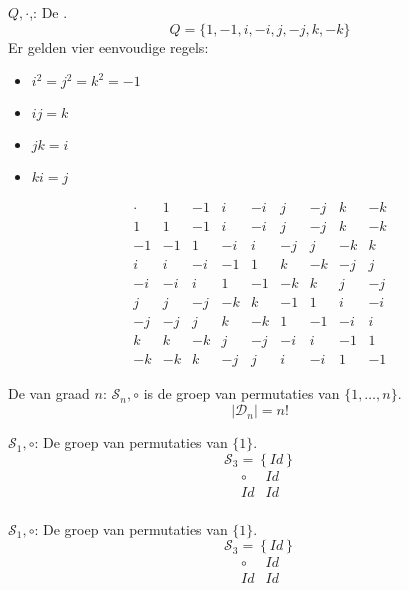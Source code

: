 \documentclass[main.tex]{subfiles}
\begin{document}
\begin{de}
  $Q,\cdot$,: De .\\
  \[ Q = \{ 1,-1,i,-i,j,-j,k,-k \} \]
  Er gelden vier eenvoudige regels:
  \begin{itemize}
  \item $i^{2}=j^{2}=k^{2}= -1$
  \item $ij=k$
  \item $jk=i$
  \item $ki=j$
  \end{itemize}
  \[
  \begin{array}{r|rrrrrrrr}
    \cdot & 1 & -1 & i & -i & j & -j & k & -k\\
    \hline
    1 & 1 & -1 & i & -i & j & -j & k & -k\\
    -1 & -1 & 1 & -i & i & -j & j & -k & k\\
    i & i & -i & -1 & 1 & k & -k & -j & j\\
    -i & -i & i & 1 & -1 & -k & k & j & -j\\
    j & j & -j & -k & k & -1 & 1 & i & -i\\
    -j & -j & j & k & -k & 1 & -1 & -i & i\\
    k & k & -k & j & -j & -i & i & -1 & 1\\
    -k & -k & k & -j & j & i & -i & 1 & -1
  \end{array}
  \]
\commn \cycln
\end{de}


\begin{de}
  De  van graad $n$: $\mathcal{S}_{n},\circ$ is de groep van permutaties van $\{ 1,\dotsc,n \}$.
  \[ |\mathcal{D}_{n}| = n! \]
  \commn \cycln
\end{de}

\begin{vb}
  $\mathcal{S}_{1},\circ$: De groep van permutaties van $\{ 1 \}$.
  \[ \mathcal{S}_{3} = \left\{ Id \right\} \]
  \[
  \begin{array}{c|c}
    \circ & Id \\
    \hline
    Id & Id\\
  \end{array}
  \]
\commj {}
\end{vb}

\begin{vb}
  $\mathcal{S}_{1},\circ$: De groep van permutaties van $\{ 1 \}$.
  \[ \mathcal{S}_{3} = \left\{ Id \right\} \]
  \[
  \begin{array}{c|c}
    \circ & Id \\
    \hline
    Id & Id\\
  \end{array}
  \]
\commj {}
\end{vb}
\end{document}
